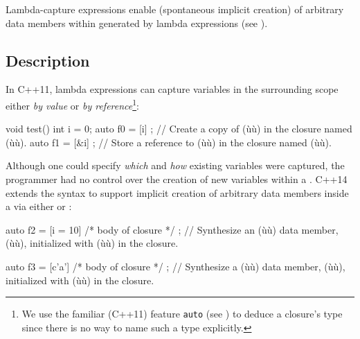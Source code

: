 


\setcounter{table}{0}
\setcounter{footnote}{0}
\setcounter{lstlisting}{0}

Lambda-capture expressions enable  (spontaneous implicit creation) of
arbitrary data members within  generated by
lambda expressions (see ).

\subsection[Description]{Description}\label{description}

In C++11, lambda expressions can capture variables in the
surrounding scope either \emph{by value} or \emph{by reference}{\cprotect\footnote{We use the familiar (C++11) feature
  \lstinline!auto! (see ) to deduce a closure's type since there is no
  way to name such a type explicitly.}}:

\begin{emcppslisting}
void test()
{
    int i = 0;
    auto f0 = [i]{ };   // Create a copy of (ù{}ù) in the closure named (ù{}ù).
    auto f1 = [&i]{ };  // Store a reference to (ù{}ù) in the closure named (ù{}ù).
}
\end{emcppslisting}

\noindent Although one could specify \emph{which} and \emph{how} existing
variables were captured, the programmer had no control over the creation
of new variables within a . C++14 extends the
 syntax to support implicit creation of
arbitrary data members inside a  via either  or :

\begin{emcppslisting}[emcppsstandards={c++14}]
auto f2 = [i = 10]{ /* body of closure */ };
    // Synthesize an (ù{}ù) data member, (ù{}ù), initialized with (ù{}ù) in the closure.

auto f3 = [c{'a'}]{ /* body of closure */ };
    // Synthesize a (ù{}ù) data member, (ù{}ù), initialized with (ù{}ù) in the closure.
\end{emcppslisting}

